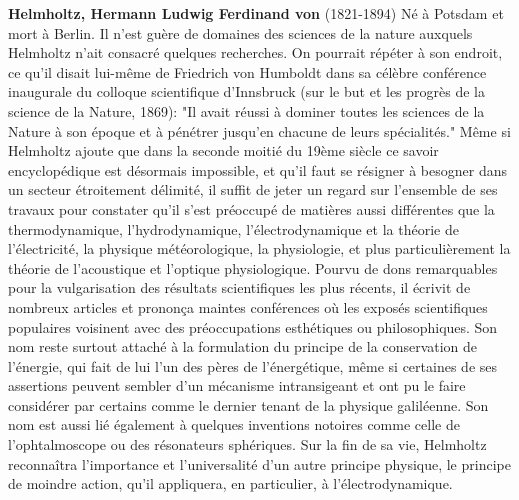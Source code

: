 \textbf{Helmholtz, Hermann Ludwig Ferdinand von} (1821-1894) Né à Potsdam et mort à Berlin. Il n'est guère de domaines des sciences de la nature auxquels Helmholtz n'ait consacré quelques recherches. On pourrait répéter à son endroit, ce qu'il disait lui-même de Friedrich von Humboldt dans sa célèbre conférence inaugurale du colloque scientifique d'Innsbruck (sur le but et les progrès de la science de la Nature, 1869): "Il avait réussi à dominer toutes les sciences de la Nature à son époque et à pénétrer jusqu'en chacune de leurs spécialités." Même si Helmholtz ajoute que dans la seconde moitié du 19ème siècle ce savoir encyclopédique est désormais impossible, et qu'il faut se résigner à besogner dans un secteur étroitement délimité, il suffit de jeter un regard sur l'ensemble de ses travaux pour constater qu'il s'est préoccupé de matières aussi différentes que la thermodynamique, l'hydrodynamique, l'électrodynamique et la théorie de l'électricité, la physique météorologique, la physiologie, et plus particulièrement la théorie de l'acoustique et l'optique physiologique. Pourvu de dons remarquables pour la vulgarisation des résultats scientifiques les plus récents, il écrivit de nombreux articles et prononça maintes conférences où les exposés scientifiques populaires voisinent avec des préoccupations esthétiques ou philosophiques. Son nom reste surtout attaché à la formulation du principe de la conservation de l'énergie, qui fait de lui l'un des pères de l'énergétique, même si certaines de ses assertions peuvent sembler d'un mécanisme intransigeant et ont pu le faire considérer par certains comme le dernier tenant de la physique galiléenne. Son nom est aussi lié également à quelques inventions notoires comme celle de l'ophtalmoscope ou des résonateurs sphériques. Sur la fin de sa vie, Helmholtz reconnaîtra l'importance et l'universalité d'un autre principe physique, le principe de moindre action, qu'il appliquera, en particulier, à l'électrodynamique.


